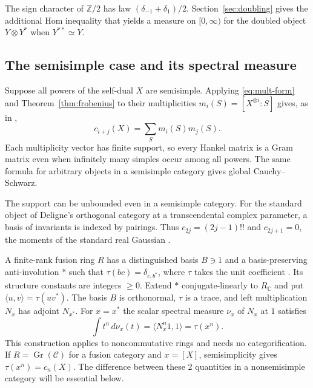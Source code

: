 \documentclass[11pt,reqno]{amsart}
\theoremstyle{definition}
\newcommand{\C}{\mathcal C}
\newcommand{\CC}{\mathbb C}
\newcommand{\ZZ}{\mathbb Z}
\DeclareMathOperator{\Gr}{Gr}
\begin{document}
The sign character of $\ZZ/2$ has law $(\delta_{-1}+\delta_1)/2$. Section~\ref{sec:doubling} gives the additional Hom inequality that yields a measure on $[0,\infty)$ for the doubled object $Y\otimes Y^*$ when $Y^{**}\simeq Y$.

\subsection{The semisimple case and its spectral measure}\label{sec:fusion}
Suppose all powers of the self-dual $X$ are semisimple. Applying \eqref{eq:mult-form} and Theorem~\ref{thm:frobenius} to their multiplicities $m_i(S)=[X^{\otimes i}:S]$ gives, as in \cite[Corollary~2.6]{FFK},
\begin{equation}\label{eq:gram}
 c_{i+j}(X)=\sum_{S}m_i(S)m_j(S).
\end{equation}
Each multiplicity vector has finite support, so every Hankel matrix is a Gram matrix even when infinitely many simples occur among all powers. The same formula for arbitrary objects in a semisimple category gives global Cauchy--Schwarz.

The support can be unbounded even in a semisimple category. For the standard object of Deligne's orthogonal category at a transcendental complex parameter, a basis of invariants is indexed by pairings. Thus $c_{2j}=(2j-1)!!$ and $c_{2j+1}=0$, the moments of the standard real Gaussian \cite[Remark~3.8 and the following paragraph]{FFK}.

A finite-rank fusion ring $R$ has a distinguished basis $B\ni1$ and a
basis-preserving anti-involution $*$ such that
$\tau(bc)=\delta_{c,b^*}$, where $\tau$ takes the unit coefficient
\cite[\S3.1]{EGNO}. Its structure constants are integers $\geq0$.
Extend $*$ conjugate-linearly to $R_{\CC}$ and put
$\langle u,v\rangle=\tau(uv^*)$. The basis $B$ is orthonormal,
$\tau$ is a trace, and left multiplication $N_x$ has adjoint $N_{x^*}$.
For $x=x^*$ the scalar spectral measure $\nu_x$ of $N_x$ at $1$ satisfies
\[
        \int t^n\,d\nu_x(t)=\langle N_x^n1,1\rangle=\tau(x^n).
\]
This construction applies to noncommutative rings and needs no
categorification. If $R=\Gr(\C)$ for a fusion category and $x=[X]$,
semisimplicity gives $\tau(x^n)=c_n(X)$. The difference between these
2 quantities in a nonsemisimple category will be essential below.
\end{document}
